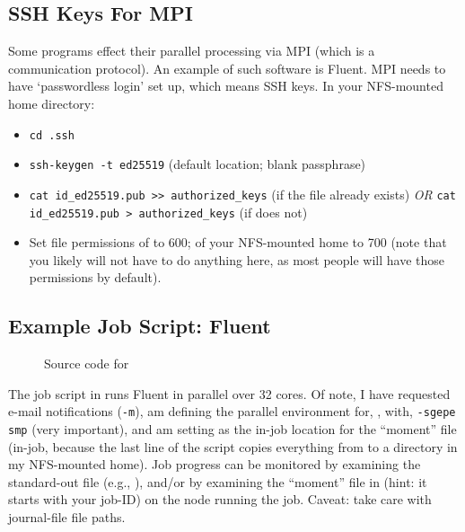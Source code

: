 \documentclass{easychair}
\begin{document}
\subsection{SSH Keys For MPI}

Some programs effect their parallel processing via MPI (which is a 
communication protocol). An example of such software is Fluent. MPI needs to 
have `passwordless login' set up, which means SSH keys. In your NFS-mounted 
home directory:

\begin{itemize}
\item
\texttt{cd .ssh}
\item
\texttt{ssh-keygen -t ed25519} (default location; blank passphrase) 
\item
\texttt{cat id\_ed25519.pub >> authorized\_keys} (if the 
file already exists) \emph{OR} \texttt{cat id\_ed25519.pub > authorized\_keys} (if does not) 
\item
Set file permissions of  to 600; of your NFS-mounted home
to 700 (note that you likely will not have to do anything here, as most people
will have those permissions by default). 
\end{itemize}

\subsection{Example Job Script: Fluent}

\begin{figure}[htpb]
    
    \caption{Source code for }
	\label{fig:fluent.sh}
\end{figure}

The job script in  runs Fluent in parallel over 32 cores. Of note, I have requested e-mail notifications (\texttt{-m}), am defining the parallel environment for, , with, \texttt{-sgepe smp} (very important), and am setting  as the in-job location for the ``moment''  file (in-job, because the last line of the script copies everything from  to a directory in my NFS-mounted home). Job progress can be monitored by examining the standard-out file (e.g., ), and/or by examining the ``moment'' file in  (hint: it starts with your job-ID) on the node running the job. Caveat: take care with journal-file file paths.
\end{document}
